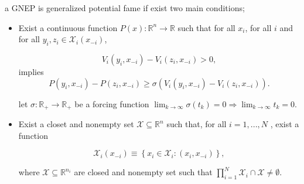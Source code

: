 \begin{definition}
a GNEP is generalized potential fame if exist two main conditions;
\begin{itemize}
    \item Exist a continuous function $P(x) : \mathbb{R}^n \to \mathbb{R}$ such that for all $x_i$, for all $i$ and for all $y_i, z_i \in \mathcal{X}_i(x_{-i})$, 

    \begin{equation}
        V_i(y_i, x_{-i})-V_i(z_i, x_{-i}) > 0,
    \end{equation}
implies
    \begin{equation}
        P(y_i, x_{-i})-P(z_i, x_{-i}) \ge \sigma (V_i(y_i, x_{-i})-V_i(z_i, x_{-i}) ).
    \end{equation}

let $\sigma : \mathbb{R}_+ \to \mathbb{R}_+$ be a forcing function $\lim_{k\to \infty} \sigma (t_k) = 0 \Rightarrow \lim_{k\to \infty} t_k = 0$.

\item Exist a closet and nonempty set $\mathcal{X} \subseteq \mathbb{R}^n$  such that, for all $i = 1, ... , N$ , exist a function

\begin{equation}
    \mathcal{X}_i(x_{-i}) \equiv \left\{ x_i \in \mathcal{X}_i : (x_i, x_{-i}) \right\},
\end{equation}

where $\mathcal{X} \subseteq \mathbb{R}^{n_i}$ are closed and nonempty set such that $\prod_{i=1}^{N} \mathcal{X}_i \cap \mathcal{X} \neq \emptyset$.

\end{itemize}

\end{definition}

